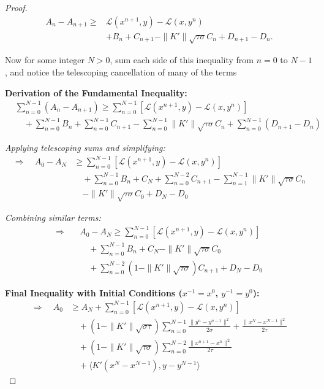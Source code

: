 \documentclass[twoside,12pt,openright]{report}  %
\begin{document}
\begin{proof}
\[
\begin{aligned}
    A_n -A_{n+1}  \geq& \mathcal{L}(x^{n+1},y)- \mathcal{L}(x,y^n)\\ & +B_n +C_{n+1}-\|K'\|\sqrt{\tau\sigma}C_n + D_{n+1}-D_n.
\end{aligned}
\]


Now for some integer $N>0$, sum each side of this inequality from $n=0$ to $N-1$, and notice the telescoping cancellation of many of the terms

\noindent\textbf{Derivation of the Fundamental Inequality:}
\begin{align*}
&\sum_{n=0}^{N-1}(A_n - A_{n+1}) \ge 
\sum_{n=0}^{N-1} \left[ \mathcal{L}(x^{n+1},y)- \mathcal{L}(x,y^n) \right] \\
&\quad + \sum_{n=0}^{N-1} B_n + \sum_{n=0}^{N-1} C_{n+1} - \sum_{n=0}^{N-1} \|K'\|\sqrt{\tau\sigma}  C_n + \sum_{n=0}^{N-1} (D_{n+1} - D_n)
\end{align*}

\noindent\textit{Applying telescoping sums and simplifying:}
\begin{align*}
\Rightarrow\quad
A_0 - A_N &\ge 
\sum_{n=0}^{N-1} \left[ \mathcal{L}(x^{n+1},y)- \mathcal{L}(x,y^n) \right] \\
&\quad + \sum_{n=0}^{N-1} B_n + C_N + \sum_{n=0}^{N-2} C_{n+1} - \sum_{n=1}^{N-1} \|K'\|\sqrt{\tau\sigma}  C_n \\
&\quad - \|K'\|\sqrt{\tau\sigma}  C_0 + D_N - D_0
\end{align*}

\noindent\textit{Combining similar terms:}
\begin{align*}
\Rightarrow\quad
&A_0 - A_N \ge 
\sum_{n=0}^{N-1} \left[ \mathcal{L}(x^{n+1},y)- \mathcal{L}(x,y^n) \right] \\
&\quad + \sum_{n=0}^{N-1} B_n + C_N - \|K'\|\sqrt{\tau\sigma}  C_0 \\
&\quad + \sum_{n=0}^{N-2} (1 - \|K'\|\sqrt{\tau\sigma})  C_{n+1} + D_N - D_0
\end{align*}

\noindent\textbf{Final Inequality with Initial Conditions ($x^{-1} = x^0$, $y^{-1} = y^0$):}
\begin{align*}
\Rightarrow\quad
A_0 &\ge A_N +
\sum_{n=0}^{N-1} \left[ \mathcal{L}(x^{n+1},y)- \mathcal{L}(x,y^n) \right] \\
&\quad + (1 - \|K'\|\sqrt{\sigma\tau}) \sum_{n=0}^{N-1} \frac{\|y^n - y^{n-1}\|^2}{2\sigma} + \frac{\|x^N - x^{N-1}\|^2}{2\tau} \\
&\quad + (1 - \|K'\|\sqrt{\tau\sigma}) \sum_{n=0}^{N-2} \frac{\|x^{n+1} - x^n\|^2}{2\tau} \\
&\quad + \langle K'(x^N - x^{N-1}), y - y^{N-1} \rangle
\end{align*}


\end{proof}
\end{document}
